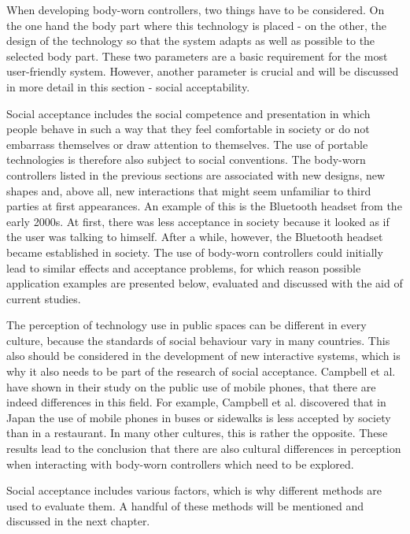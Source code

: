 \documentclass{sigchi}
\begin{document}
When developing body-worn controllers, two things have to be considered. On the one hand the body part where this technology is placed - on the other, the design of the technology so that the system adapts as well as possible to the selected body part. These two parameters are a basic requirement for the most user-friendly system. \cite{touch-wrist} However, another parameter is crucial and will be discussed in more detail in this section - social acceptability.

Social acceptance includes the social competence and presentation in which people behave in such a way that they feel comfortable in society or do not embarrass themselves or draw attention to themselves. \cite{self-everyday} The use of portable technologies is therefore also subject to social conventions. The body-worn controllers listed in the previous sections are associated with new designs, new shapes and, above all, new interactions that might seem unfamiliar to third parties at first appearances.
An example of this is the Bluetooth headset from the early 2000s. At first, there was less acceptance in society because it looked as if the user was talking to himself. After a while, however, the Bluetooth headset became established in society. \cite{usable-gesture} The use of body-worn controllers could initially lead to similar effects and acceptance problems, for which reason possible application examples are presented below, evaluated and discussed with the aid of current studies.

The perception of technology use in public spaces can be different in every culture, because the standards of social behaviour vary in many countries. This also should be considered in the development of new interactive systems, which is why it also needs to be part of the research of social acceptance. Campbell et al. have shown in their study on the public use of mobile phones, that there are indeed differences in this field. For example, Campbell et al. discovered that in Japan the use of mobile phones in buses or sidewalks is less accepted by society than in a restaurant. In many other cultures, this is rather the opposite. \cite{mobile-phones} These results lead to the conclusion that there are also cultural differences in perception when interacting with body-worn controllers which need to be explored.

Social acceptance includes various factors, which is why different methods are used to evaluate them. A handful of these methods will be mentioned and discussed in the next chapter.
\end{document}
